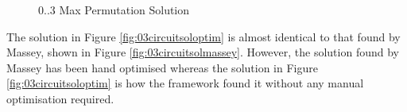 \begin{figure}
\centering
{}
\caption{0..3 Max Permutation Solution}
\label{fig:03circuitsol}
\end{figure}

The solution in Figure \ref{fig:03circuitsoloptim} is almost identical to that found by Massey, shown in Figure \ref{fig:03circuitsolmassey}.
However, the solution found by Massey has been hand optimised whereas the solution in Figure \ref{fig:03circuitsoloptim} is how the framework found it without any manual optimisation required.

